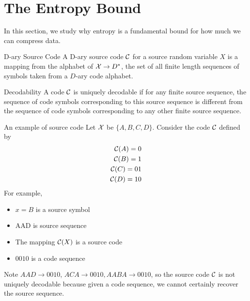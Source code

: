 \documentclass[../main.tex]{subfiles}
\begin{document}
\section{The Entropy Bound}
In this section, we study why entropy is a fundamental bound for how much we can compress data.
\begin{gbox}{D-ary Source Code}
    A D-ary source code $\mathcal{C}$ for a source random variable $X$ is a mapping from the alphabet of $\mathcal{X}\to D^*$, the set of all finite length sequences of symbols taken from a $D$-ary code alphabet.
\end{gbox}
\begin{gbox}{Decodability}
    A code $\mathcal{C}$ is uniquely decodable if for any finite source sequence, the sequence of code symbols corresponding to this source sequence is different from the sequence of code symbols corresponding to any other finite source sequence.
\end{gbox}
\begin{pbox}{An example of source code}
    Let $\mathcal{X}$ be $\{A,B,C,D\}$. Consider the code $\mathcal{C}$ defined by \begin{align*}
        \mathcal{C}(A)=0\\
        \mathcal{C}(B)=1\\
        \mathcal{C}(C)=01\\
        \mathcal{C}(D)=10
    \end{align*}
    For example, \begin{itemize}
        \item $x=B$ is a source symbol
        \item AAD is source sequence
        \item The mapping $\mathcal{C}(X)$ is a source code
        \item $0010$ is a code sequence
    \end{itemize}
Note $AAD\to 0010$, $ACA\to 0010, AABA\to 0010$, so the source code $\mathcal{C}$ is not uniquely decodable because given a code sequence, we cannot certainly recover the source sequence.
\end{pbox}
\end{document}
